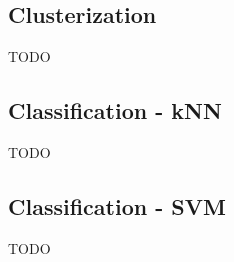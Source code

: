 \subsection{Clusterization}
TODO

\subsection{Classification - kNN}
TODO

\subsection{Classification - SVM}
TODO

